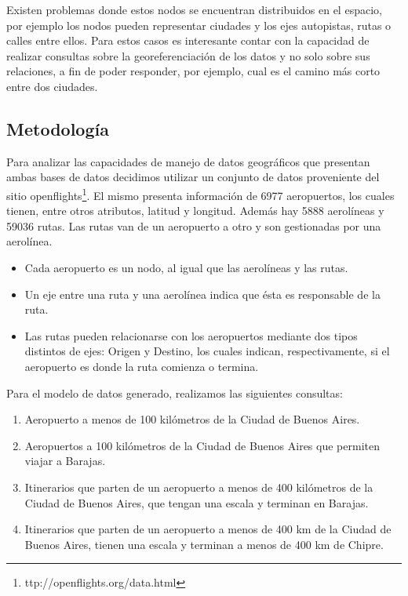 \documentclass{llncs}
\begin{document}
Existen problemas donde estos nodos se encuentran distribuidos en el
espacio, por ejemplo los nodos pueden representar ciudades y los ejes
autopistas, rutas o calles entre ellos. Para estos casos es
interesante contar con la capacidad de realizar consultas sobre la
georeferenciación de los datos y no solo sobre sus relaciones, a fin
de poder responder, por ejemplo, cual es el camino más corto entre dos
ciudades.

\subsection{Metodología}
Para analizar las capacidades de manejo de datos geográficos que presentan ambas bases de datos decidimos utilizar un conjunto de datos proveniente del sitio openflights\footnote{ttp://openflights.org/data.html}. El mismo presenta información de 6977 aeropuertos, los cuales tienen, entre otros atributos, latitud y longitud. Además hay 5888 aerolíneas y 59036 rutas. Las rutas van de un aeropuerto a otro y son gestionadas por una aerolínea.

\begin{itemize}
\item Cada aeropuerto es un nodo, al igual que las aerolíneas y las rutas.
\item Un eje entre una ruta y una aerolínea indica que ésta es responsable de la ruta.
\item Las rutas pueden relacionarse con los aeropuertos mediante dos tipos distintos de ejes: Origen y Destino, los cuales indican, respectivamente, si el aeropuerto es donde la ruta comienza o termina.
\end{itemize}

Para el modelo de datos generado, realizamos las siguientes consultas:
\begin{enumerate}
\item Aeropuerto a menos de 100 kilómetros de la Ciudad de Buenos Aires.
\item Aeropuertos a 100 kilómetros de la Ciudad de Buenos Aires que permiten viajar a Barajas.
\item Itinerarios que parten de un aeropuerto a menos de 400 kilómetros de la Ciudad de Buenos Aires, que tengan una escala y terminan en Barajas.
\item Itinerarios que parten de un aeropuerto a menos de 400 km de la Ciudad de Buenos Aires, tienen una escala y terminan a menos de 400 km de Chipre.
\end{enumerate}
\end{document}
